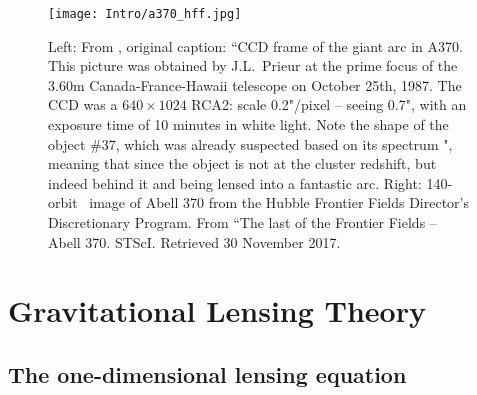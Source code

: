 \begin{figure}
\texttt{[image: Intro/a370\_hff.jpg]}
\caption[Images of Abell 370 -- the first cluster lens]{Left: From \citet{Soucail:1988kx}, original caption: ``CCD frame of the giant arc in A370. This picture was obtained by J.L.~Prieur at the prime focus of the 3.60m Canada-France-Hawaii telescope on October 25th, 1987. The CCD was a $640\times1024$ RCA2: scale 0.2"/pixel -- seeing 0.7", with an exposure time of 10 minutes in white light. Note the shape of the object \#37, which was already suspected based on its spectrum \citet{Soucail:1987sf}", meaning that since the object is not at the cluster redshift, but indeed behind it and being lensed into a fantastic arc. Right: 140-orbit \hst\ image of Abell 370 from the Hubble Frontier Fields Director's Discretionary Program. From ``The last of the Frontier Fields -- Abell 370. STScI. Retrieved 30 November 2017.}
\label{intro:fig:a370}
\end{figure}


\section{Gravitational Lensing Theory}

\subsection{The one-dimensional lensing equation}

